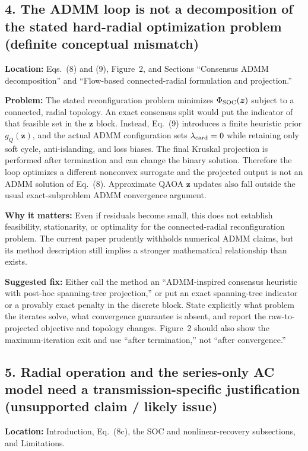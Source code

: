 \documentclass[11pt]{article}
\newcommand{\loc}[1]{\textbf{Location:} #1}
\newcommand{\problem}{\textbf{Problem:}}
\newcommand{\impact}{\textbf{Why it matters:}}
\newcommand{\fix}{\textbf{Suggested fix:}}
\begin{document}
\subsection*{4. The ADMM loop is not a decomposition of the stated
hard-radial optimization problem (definite conceptual mismatch)}

\loc{Eqs.~(8) and (9), Figure~2, and Sections ``Consensus ADMM decomposition''
and ``Flow-based connected-radial formulation and projection.''}

\problem{} The stated reconfiguration problem minimizes
$\Phi_{\rm SOC}(\boldsymbol z)$ subject to a connected, radial topology.  An
exact consensus split would put the indicator of that feasible set in the
$\boldsymbol z$ block.  Instead, Eq.~(9) introduces a finite heuristic prior
$g_Q(\boldsymbol z)$, and the actual ADMM configuration sets
$\lambda_{\rm card}=0$ while retaining only soft cycle, anti-islanding, and
loss biases.  The final Kruskal projection is performed after termination and
can change the binary solution.  Therefore the loop optimizes a different
nonconvex surrogate and the projected output is not an ADMM solution of
Eq.~(8).  Approximate QAOA $\boldsymbol z$ updates also fall outside the usual
exact-subproblem ADMM convergence argument.

\impact{} Even if residuals become small, this does not establish feasibility,
stationarity, or optimality for the connected-radial reconfiguration problem.
The current paper prudently withholds numerical ADMM claims, but its method
description still implies a stronger mathematical relationship than exists.

\fix{} Either call the method an ``ADMM-inspired consensus heuristic with
post-hoc spanning-tree projection,'' or put an exact spanning-tree indicator
or a provably exact penalty in the discrete block.  State explicitly what
problem the iterates solve, what convergence guarantee is absent, and report
the raw-to-projected objective and topology changes.  Figure~2 should also
show the maximum-iteration exit and use ``after termination,'' not ``after
convergence.''

\subsection*{5. Radial operation and the series-only AC model need a
transmission-specific justification (unsupported claim / likely issue)}

\loc{Introduction, Eq.~(8c), the SOC and nonlinear-recovery subsections, and
Limitations.}
\end{document}
